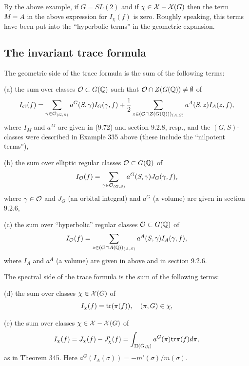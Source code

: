 By the above example, if $G=SL(2)$ and if
$\chi\in {\cal X}-{\cal X}(G)$ then the term $M=A$ in
the above expression for $I_\chi (f)$ is zero. Roughly speaking,
this terms have been put into the ``hyperbolic terms'' in
the geometric expansion.
 
\subsection{The invariant trace formula}

The geometric side of the trace formula is the sum of the following terms:

(a) the sum over classes ${\cal{O}}\subset G({\Bbb{Q}})$
such that ${\cal{O}}\cap Z(G({\Bbb{Q}}))
\not= \emptyset$ of
\begin{equation}
I_{\cal{O}}(f)=\sum_{\gamma\in {\cal{O}}_{(G,S)}}
a^G(S,\gamma)I_G(\gamma,f)
+{1\over 2}\sum_{z\in ({\cal{O}}\cap Z(G({\Bbb{Q}})))_{(A,S)}}
a^A(S,z)I_A(z,f),
\end{equation}
where $I_M$ and $a^M$ are given in (9.72) and section 9.2.8,
resp., and the $(G,S)$-classes were described in Example 335
above (these include the ``nilpotent terms''),

(b) the sum over elliptic regular classes 
${\cal{O}}\subset G({\Bbb{Q}})$
of
\begin{equation}
I_{\cal{O}}(f)=
\sum_{\gamma\in {\cal{O}}_{(G,S)}}
a^G(S,\gamma)J_G(\gamma,f),
\end{equation}
where $\gamma\in {\cal{O}}$ and
$J_G$ (an orbital integral) and $a^G$ (a volume)
are given in section 9.2.6,

(c) the sum over ``hyperbolic'' regular classes
${\cal{O}}\subset G({\Bbb{Q}})$
of
\begin{equation}
I_{\cal{O}}(f)=
\sum_{z\in ({\cal{O}}\cap A({\Bbb{Q}}))_{(A,S)}}
a^A(S,\gamma)I_A(\gamma,f),
\end{equation}
where $I_A$ and $a^A$ (a volume)
are given in above and in section 9.2.6.

The spectral side of the trace formula is the sum of the following terms:

(d) the sum over classes $\chi\in {\cal{X}}(G)$ of
\begin{equation}
I_\chi(f)=
{\rm tr}(\pi(f)),\ \ \ (\pi,G)\in\chi,
\end{equation}

(e) the sum over classes $\chi\in {\cal{X}}-{\cal{X}}(G)$ of
\begin{equation}
I_\chi(f)=J_\chi(f)-J'_\chi(f)
=\int_{\Pi (G,\chi)}a^G(\pi ){\rm tr}\pi (f)d\pi ,
\end{equation}
as in Theorem 345. Here $a^G(I_A(\sigma))=-m'(\sigma)/m(\sigma)$.



